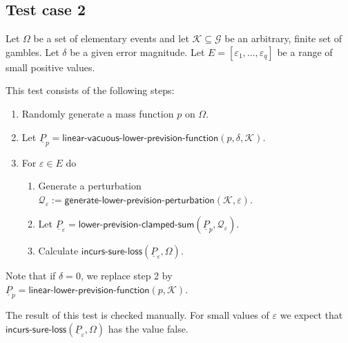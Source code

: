 \documentclass{article}
\theoremstyle{mytheorem}
\newcommand{\func}[1]{\ensuremath{\textsf{#1}}} %
\begin{document}
\subsection{Test case 2}
Let $\Omega$ be a set of elementary events and let $\mathcal{K} \subseteq \mathcal{G}$ be an arbitrary, finite set of gambles. Let $\delta$ be a given error magnitude. Let $E = [\varepsilon_1, \ldots, \varepsilon_q]$ be a range of 
small positive values.


\vspace{0.5cm}
\noindent
This test consists of the following steps:
\begin{enumerate}
    \item Randomly generate a mass function $p$ on $\Omega$.
    \item Let $\underline{P}_p = \func{linear-vacuous-lower-prevision-function}(p, \delta, \mathcal{K})$.
    \item For $\varepsilon \in E$ do
    \begin{enumerate}
        \item Generate a perturbation $\mathcal{Q}_\varepsilon := \func{generate-lower-prevision-perturbation}(\mathcal{K}, \varepsilon)$.
        \item Let $\underline{P}_\varepsilon = \func{lower-prevision-clamped-sum}(\underline{P}_p, \mathcal{Q}_\varepsilon)$.
        \item Calculate $\func{incurs-sure-loss}(\underline{P}_\varepsilon, \Omega)$.
    \end{enumerate}    
\end{enumerate}
Note that if $\delta=0$, we replace step 2 by $\underline{P}_p = \func{linear-lower-prevision-function}(p, \mathcal{K})$.

\vspace{0.5cm}
\noindent
The result of this test is checked manually. For small values of $\varepsilon$ we expect that $\func{incurs-sure-loss}(\underline{P}_\varepsilon, \Omega)$ has the value false.
\end{document}
